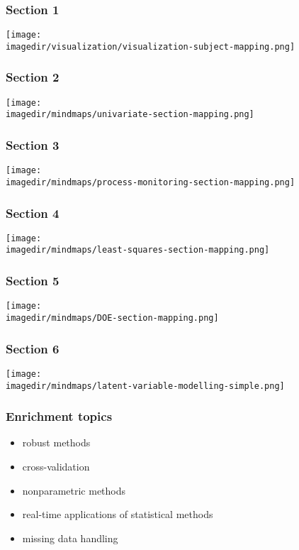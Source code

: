 \begin{frame}\frametitle{Section 1}
	
	\texttt{[image: \\imagedir/visualization/visualization-subject-mapping.png]}
\end{frame}

\begin{frame}\frametitle{Section 2}
	
	\texttt{[image: \\imagedir/mindmaps/univariate-section-mapping.png]}
\end{frame}

\begin{frame}\frametitle{Section 3}
	
	\texttt{[image: \\imagedir/mindmaps/process-monitoring-section-mapping.png]}
\end{frame}

\begin{frame}\frametitle{Section 4}
	
	\texttt{[image: \\imagedir/mindmaps/least-squares-section-mapping.png]}
\end{frame}

\begin{frame}\frametitle{Section 5}
	
	\texttt{[image: \\imagedir/mindmaps/DOE-section-mapping.png]}
\end{frame}

\begin{frame}\frametitle{Section 6}
	
	\texttt{[image: \\imagedir/mindmaps/latent-variable-modelling-simple.png]}
\end{frame}

\begin{frame}\frametitle{Enrichment topics}
	\begin{itemize}
		\item	robust methods 
		\item	cross-validation 
		\item	nonparametric methods 
		\item	real-time applications of statistical methods 
		\item	missing data handling 
	\end{itemize}
\end{frame}
